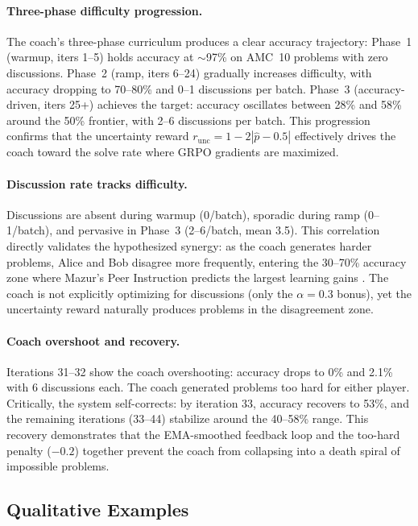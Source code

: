 \documentclass{article}
\begin{document}
\paragraph{Three-phase difficulty progression.} The coach's three-phase curriculum produces a clear accuracy trajectory: Phase~1 (warmup, iters 1--5) holds accuracy at ${\sim}$97\% on AMC~10 problems with zero discussions. Phase~2 (ramp, iters 6--24) gradually increases difficulty, with accuracy dropping to 70--80\% and 0--1 discussions per batch. Phase~3 (accuracy-driven, iters 25+) achieves the target: accuracy oscillates between 28\% and 58\% around the 50\% frontier, with 2--6 discussions per batch. This progression confirms that the uncertainty reward $r_{\text{unc}} = 1 - 2|\hat{p} - 0.5|$ effectively drives the coach toward the solve rate where GRPO gradients are maximized.

\paragraph{Discussion rate tracks difficulty.} Discussions are absent during warmup (0/batch), sporadic during ramp (0--1/batch), and pervasive in Phase~3 (2--6/batch, mean 3.5). This correlation directly validates the hypothesized synergy: as the coach generates harder problems, Alice and Bob disagree more frequently, entering the 30--70\% accuracy zone where Mazur's Peer Instruction predicts the largest learning gains \citep{crouch2001peer}. The coach is not explicitly optimizing for discussions (only the $\alpha\!=\!0.3$ bonus), yet the uncertainty reward naturally produces problems in the disagreement zone.

\paragraph{Coach overshoot and recovery.} Iterations 31--32 show the coach overshooting: accuracy drops to 0\% and 2.1\% with 6 discussions each. The coach generated problems too hard for either player. Critically, the system self-corrects: by iteration 33, accuracy recovers to 53\%, and the remaining iterations (33--44) stabilize around the 40--58\% range. This recovery demonstrates that the EMA-smoothed feedback loop and the too-hard penalty ($-0.2$) together prevent the coach from collapsing into a death spiral of impossible problems.

\subsection{Qualitative Examples}
\end{document}
